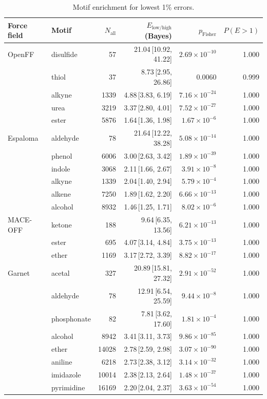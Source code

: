 \begin{table}[t]
  \centering
  \small
  \setlength{\tabcolsep}{6pt}
  \renewcommand{\arraystretch}{1.15}
  \begin{tabular}{llrrrr}
    \hline
    Force field & Motif & $N_\mathrm{all}$ & $E_{\mathrm{low/high}}$ (Bayes) & $p_\mathrm{Fisher}$ & $P(E>1)$ \\
    \hline
    OpenFF & disulfide & 57 & 21.04\,[10.92, 41.22] & $2.69\times 10^{-10}$ & 1.000 \\
      & thiol & 37 & 8.73\,[2.95, 26.86] & 0.0060 & 0.999 \\
      & alkyne & 1339 & 4.88\,[3.83, 6.19] & $7.16\times 10^{-24}$ & 1.000 \\
      & urea & 3219 & 3.37\,[2.80, 4.01] & $7.52\times 10^{-27}$ & 1.000 \\
      & ester & 5876 & 1.64\,[1.36, 1.98] & $1.67\times 10^{-6}$ & 1.000 \\
    \hline
    Espaloma & aldehyde & 78 & 21.64\,[12.22, 38.28] & $5.08\times 10^{-14}$ & 1.000 \\
      & phenol & 6006 & 3.00\,[2.63, 3.42] & $1.89\times 10^{-39}$ & 1.000 \\
      & indole & 3068 & 2.11\,[1.66, 2.67] & $3.91\times 10^{-8}$ & 1.000 \\
      & alkyne & 1339 & 2.04\,[1.40, 2.94] & $5.79\times 10^{-4}$ & 1.000 \\
      & alkene & 7250 & 1.89\,[1.62, 2.20] & $6.66\times 10^{-13}$ & 1.000 \\
      & alcohol & 8932 & 1.46\,[1.25, 1.71] & $8.02\times 10^{-6}$ & 1.000 \\
    \hline
    MACE-OFF & ketone & 188 & 9.64\,[6.35, 13.56] & $6.21\times 10^{-13}$ & 1.000 \\
      & ester & 695 & 4.07\,[3.14, 4.84] & $3.75\times 10^{-13}$ & 1.000 \\
      & ether & 1169 & 3.17\,[2.72, 3.39] & $8.82\times 10^{-17}$ & 1.000 \\
    \hline
    Garnet & acetal & 327 & 20.89\,[15.81, 27.32] & $2.91\times 10^{-52}$ & 1.000 \\
      & aldehyde & 78 & 12.91\,[6.54, 25.59] & $9.44\times 10^{-8}$ & 1.000 \\
      & phosphonate & 82 & 7.81\,[3.62, 17.60] & $1.81\times 10^{-4}$ & 1.000 \\
      & alcohol & 8942 & 3.41\,[3.11, 3.73] & $9.86\times 10^{-85}$ & 1.000 \\
      & ether & 14028 & 2.78\,[2.59, 2.98] & $3.07\times 10^{-90}$ & 1.000 \\
      & aniline & 6218 & 2.73\,[2.38, 3.12] & $3.14\times 10^{-32}$ & 1.000 \\
      & imidazole & 10014 & 2.38\,[2.13, 2.64] & $1.48\times 10^{-37}$ & 1.000 \\
      & pyrimidine & 16169 & 2.20\,[2.04, 2.37] & $3.63\times 10^{-54}$ & 1.000 \\
    \hline
  \end{tabular}
  \caption{Motif enrichment for lowest 1\% errors.}
  \label{tab:split_bonds_best}
\end{table}